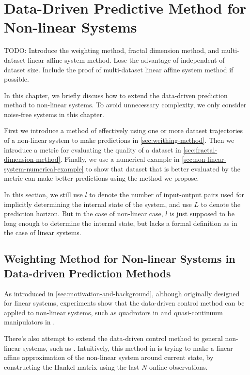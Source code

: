 \chapter{Data-Driven Predictive Method for Non-linear Systems}\label{chap:non-linear-system}
TODO: Introduce the weighting method, fractal dimension method, and multi-dataset linear affine system method.
Lose the advantage of independent of dataset size.
Include the proof of multi-dataset linear affine system method if possible.

In this chapter, we briefly discuss how to extend the data-driven prediction method to non-linear systems.
To avoid unnecessary complexity, we only consider noise-free systems in this chapter.

First we introduce a method of effectively using one or more dataset trajectories of a non-linear system to make predictions in \cref{sec:weithing-method}.
Then we introduce a metric for evaluating the quality of a dataset in \cref{sec:fractal-dimension-method}.
Finally, we use a numerical example in \cref{sec:non-linear-system-numerical-example} to show that dataset that is better evaluated by the metric can make better predictions using the method we propose.

In this section, we still use $l$ to denote the number of input-output pairs used for implicitly determining the internal state of the system, and use $L$ to denote the prediction horizon.
But in the case of non-linear case, $l$ is just supposed to be long enough to determine the internal state, but lacks a formal definition as in the case of linear systems.


\section{Weighting Method for Non-linear Systems in Data-driven Prediction Methods}\label{sec:weighting-method}

As introduced in \cref{sec:motivation-and-background}, although originally designed for linear systems, experiments show that the data-driven control method can be applied to non-linear systems, such as quadrotors in \cite{elokdaDataQuad2021} and quasi-continuum manipulators in \cite{mullerDataDrivenQCR2022}.

There's also attempt to extend the data-driven control method to general non-linear systems, such as \cite{berberichLinearTrackingMPCData2022}.
Intuitively, this method in \cite{berberichLinearTrackingMPCData2022} is trying to make a linear affine approximation of the non-linear system around current state, by constructing the Hankel matrix using the last $N$ online observations.

